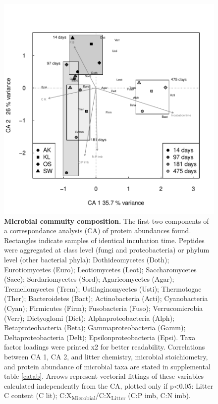 \documentclass[10pt]{article}
\begin{document}
\begin{flushleft}
\newpage
\begin{figure}[h!]
\vspace*{2mm}
\begin{center}
\includegraphics{ligpaper-metaprot_pca}
\end{center}
\caption{
{\bf Microbial commuity composition.} The first two components of a correspondance analysis (CA) of protein abundances found. Rectangles indicate samples of identical incubation time. Peptides were aggregated at class level (fungi and proteobacteria) or phylum level (other bacterial phyla): Dothideomycetes (Doth); Eurotiomycetes (Euro); Leotiomycetes (Leot); Saccharomycetes (Sacc); Sordariomycetes (Sord); Agaricomycetes (Agar); Tremellomycetes (Trem); Ustilaginomycetes (Usti); Thermotogae (Ther); Bacteroidetes (Bact); Actinobacteria (Acti); Cyanobacteria (Cyan); Firmicutes (Firm); Fusobacteria (Fuso); Verrucomicrobia (Verr); Dictyoglomi (Dict); Alphaproteobacteria (Alph); Betaproteobacteria (Beta); Gammaproteobacteria (Gamm); Deltaproteobacteria (Delt); Epsilonproteobacteria (Epsi). Taxa factor loadings were printed x2 for better readability. Correlations between CA 1, CA 2, and litter chemistry, microbial stoichiometry, and protein abundance of microbial taxa are stated in supplemental table \ref{catab}. Arrows represent vectorial fittings of these variables calculated independently from the CA, plotted only if p\textless 0.05: Litter C content (C lit); C:X\textsubscript{Microbial}/C:X\textsubscript{Litter} (C:P imb, C:N imb).}
\label{fig:metaprotpca}
\end{figure}


\end{flushleft}
\end{document}
